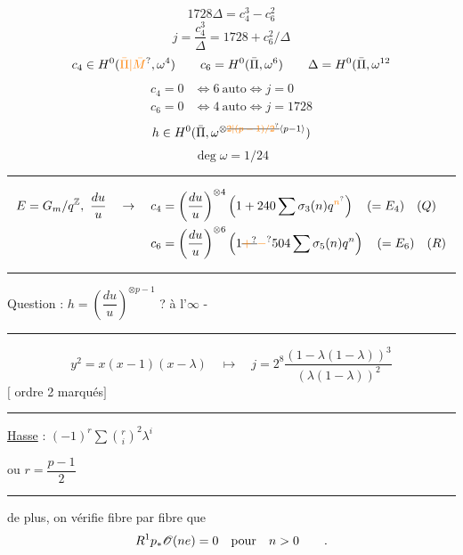 \[
1728\Delta=c_4^3-c_6^2
\]
\[
j=\frac{c_4^3}{\Delta}=1728+c_6^2/\Delta
\]
\[
c_4\in H^0(\unsure{\bar{\Pi}|\bar{M}},\omega^4)\qquad
c_6=H^0(\bar{\Pi},\omega^6)\qquad \Delta=H^0(\bar{\Pi},\omega^{12}
\]
\[
\begin{aligned}
c_4=0&\Longleftrightarrow 6\ \text{auto}\Longleftrightarrow j=0\\
c_6=0&\Longleftrightarrow 4\ \text{auto}\Longleftrightarrow j=1728
\end{aligned}
\]
\[
h\in H^0(\bar{\Pi},\omega^{\otimes\deleted{\unsure{2|(p-1)/2}}\inserted{p-1}})
\]
\[
\deg\omega=1/24
\]
\begin{center}\rule{1.4cm}{0.3pt}\end{center}
\[
\begin{aligned}
E=G_m/q^{\mathbb Z},\ \frac{du}{u}\quad\to\quad
c_4&=\left(\frac{du}{u}\right)^{\otimes4}
\left(1+240\sum\sigma_3(n)q^{\unsure{n}}\right)\quad(=E_4)\quad(Q)\\
c_6&=\left(\frac{du}{u}\right)^{\otimes6}
\left(1\deleted{\unsure{+}}\unsure{-}504\sum\sigma_5(n)q^n\right)\quad(=E_6)\quad(R)
\end{aligned}
\]
\begin{center}\rule{1.4cm}{0.3pt}\end{center}

Question : $h=\left(\dfrac{du}{u}\right)^{\otimes p-1}$ ? à l'$\infty$ -

\begin{center}\rule{1.6cm}{0.3pt}\end{center}
\[
y^2=x(x-1)(x-\lambda)\quad\longmapsto\quad
j=2^8\frac{(1-\lambda(1-\lambda))^3}{(\lambda(1-\lambda))^2}
\]
$[$ ordre 2 marqués$]$
\begin{center}\rule{1.8cm}{0.3pt}\end{center}

\uline{Hasse} : $\displaystyle(-1)^r\sum\binom{r}{i}^2\lambda^i$

ou $r=\dfrac{p-1}{2}$

\begin{center}\rule{1.6cm}{0.3pt}\end{center}
de plus, on vérifie fibre par fibre que
\[
R^1p_*\mathscr O(ne)=0\quad\text{pour}\quad n>0\qquad .
\]

